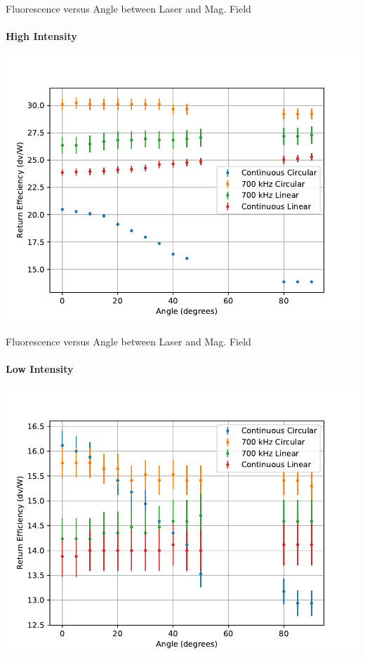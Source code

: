 \documentclass{beamer}
\begin{document}
\begin{frame}{Fluorescence versus Angle between Laser and Mag. Field}
	\framesubtitle{High Intensity}
	\centering
	\includegraphics[width = .85\textwidth]{../MRPData/MAR24/together.pdf}
\end{frame}

\begin{frame}{Fluorescence versus Angle between Laser and Mag. Field}
	\framesubtitle{Low Intensity}
	\centering
	\includegraphics[width = .85\textwidth]{../MRPData/April16/together.pdf}
\end{frame}
\end{document}
